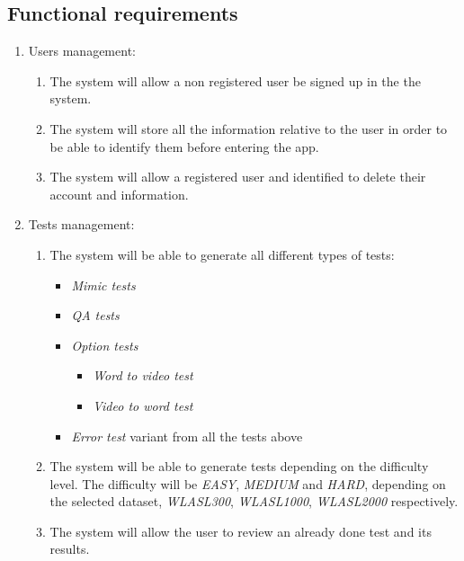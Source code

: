 \subsection{Functional requirements}
\begin{enumerate}[label=\textbf{RF\_\arabic*}, align=left, leftmargin=*]
    \item Users management:
        \begin{enumerate}[label=\textbf{\theenumi.\arabic*}, align=left, leftmargin=*]
            \item The system will allow a non registered user be signed up in the the system.
            \item The system will store all the information relative to the user in order to be able to identify them before entering the app.
            \item The system will allow a registered user and identified to delete their account and information.
        \end{enumerate}
    \item Tests management: 
        \begin{enumerate}[label=\textbf{\theenumi.\arabic*}, align=left, leftmargin=*]
            \item The system will be able to generate all different types of tests:
                \begin{itemize}[noitemsep]
                    \item \textit{Mimic tests}
                    \item \textit{QA tests}
                    \item \textit{Option tests}
                        \begin{itemize}[noitemsep]
                            \item \textit{Word to video test}
                            \item \textit{Video to word test}
                        \end{itemize}
                    \item \textit{Error test} variant from all the tests above
                \end{itemize}
            \item The system will be able to generate tests depending on the difficulty level. The difficulty will be \textit{EASY}, \textit{MEDIUM} and \textit{HARD}, depending on the selected dataset, \textit{WLASL300},  \textit{WLASL1000},  \textit{WLASL2000} respectively.
            \item The system will allow the user to review an already done test and its results.

\end{enumerate}
\end{enumerate}
